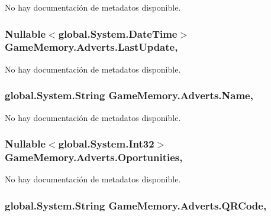 No hay documentación de metadatos disponible. 

\hypertarget{class_game_memory_1_1_adverts_a25bc849ff293d51367af7f4a00da7c63}{
\subsubsection[{Last\-Update}]{\setlength{\rightskip}{0pt plus 5cm}Nullable$<$global.\-System.\-Date\-Time$>$ Game\-Memory.\-Adverts.\-Last\-Update\hspace{0.3cm}{\ttfamily [get]}, {\ttfamily [set]}}}\label{class_game_memory_1_1_adverts_a25bc849ff293d51367af7f4a00da7c63}


No hay documentación de metadatos disponible. 

\hypertarget{class_game_memory_1_1_adverts_a71dad8d0f7b7aa11e38a2f85a15615f3}{
\subsubsection[{Name}]{\setlength{\rightskip}{0pt plus 5cm}global.\-System.\-String Game\-Memory.\-Adverts.\-Name\hspace{0.3cm}{\ttfamily [get]}, {\ttfamily [set]}}}\label{class_game_memory_1_1_adverts_a71dad8d0f7b7aa11e38a2f85a15615f3}


No hay documentación de metadatos disponible. 

\hypertarget{class_game_memory_1_1_adverts_af3a5c0ddac27db7dd0bbf88ac1b250df}{
\subsubsection[{Oportunities}]{\setlength{\rightskip}{0pt plus 5cm}Nullable$<$global.\-System.\-Int32$>$ Game\-Memory.\-Adverts.\-Oportunities\hspace{0.3cm}{\ttfamily [get]}, {\ttfamily [set]}}}\label{class_game_memory_1_1_adverts_af3a5c0ddac27db7dd0bbf88ac1b250df}


No hay documentación de metadatos disponible. 

\hypertarget{class_game_memory_1_1_adverts_a14b533de1869e89623ca3e4e6e9f7009}{
\subsubsection[{Q\-R\-Code}]{\setlength{\rightskip}{0pt plus 5cm}global.\-System.\-String Game\-Memory.\-Adverts.\-Q\-R\-Code\hspace{0.3cm}{\ttfamily [get]}, {\ttfamily [set]}}}\label{class_game_memory_1_1_adverts_a14b533de1869e89623ca3e4e6e9f7009}


